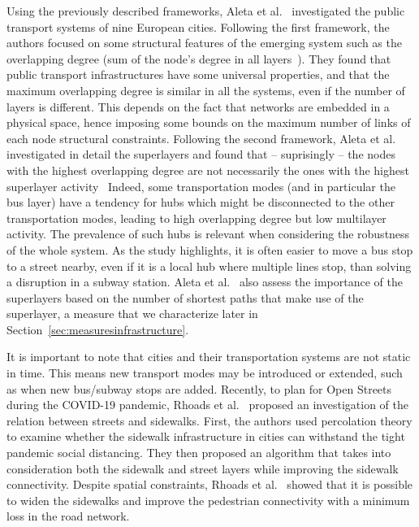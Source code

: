 Using the previously described frameworks, Aleta et al.~\cite{Aleta2017Multilayer} investigated the public transport systems of nine European cities. Following the first framework, the authors focused on some structural features of the emerging system such as the overlapping degree (sum of the node's degree in all layers~\cite{battiston2014structural}). They found that public transport infrastructures have some universal properties, and that the maximum overlapping degree is similar in all the systems, even if the number of layers is different. This depends on the fact that networks are embedded in a physical space, hence imposing some bounds on the maximum number of links of each node structural constraints. Following the second framework, Aleta et al.~\cite{Aleta2017Multilayer} investigated in detail the superlayers and found that -- suprisingly -- the nodes with the highest overlapping degree are not necessarily the ones with the highest superlayer activity~\cite{nicosia2015measuring} Indeed, some transportation modes (and in particular the bus layer) have a tendency for hubs which might be disconnected to the other transportation modes, leading to high overlapping degree but low multilayer activity. The prevalence of such hubs is relevant when considering the robustness of the whole system. As the study highlights, it is often easier to move a bus stop to a street nearby, even if it is a local hub where multiple lines stop, than solving a disruption in a subway station. Aleta et al.~\cite{Aleta2017Multilayer} also assess the importance of the superlayers based on the number of shortest paths that make use of the superlayer, a measure that we characterize later in Section~\ref{sec:measuresinfrastructure}.

It is important to note that cities and their transportation systems are not static in time. This means new transport modes may be introduced or extended, such as when new bus/subway stops are added. Recently, to plan for Open Streets during the COVID-19 pandemic, Rhoads et al.~\cite{rhoads2020planning} proposed an investigation of the relation between streets and sidewalks. First, the authors used percolation theory to examine whether the sidewalk infrastructure in cities can withstand the tight pandemic social distancing. They then proposed an algorithm that takes into consideration both the sidewalk and street layers while improving the sidewalk connectivity. Despite spatial constraints, Rhoads et al.~\cite{rhoads2020planning} showed that it is possible to widen the sidewalks and improve the pedestrian connectivity with a minimum loss in the road network. 

